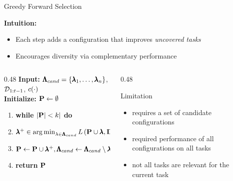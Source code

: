 \documentclass[main]{subfiles}
\begin{document}
\begin{frame}{Greedy Forward Selection}

\textbf{Intuition:}
\begin{itemize}
    \item Each step adds a configuration that improves \emph{uncovered tasks}
    \item Encourages diversity via complementary performance
\end{itemize}

\vspace{0.5cm}

\begin{columns}[T,onlytextwidth]
\begin{column}{0.48\textwidth}
\textbf{Input:} $\pmb{\Lambda}_{cand} = \{\pmb{\lambda}_1, \dots, \pmb{\lambda}_n\}$, $\mathcal{D}_{1:t-1}$, $c(\cdot)$ \\
\textbf{Initialize:} $\mathbf{P} \gets \emptyset$ \\
\begin{enumerate}
    \item \textbf{while $|\mathbf{P}| < k|$ do} \\
    \item \quad $\pmb{\lambda}^+ \in \operatorname*{arg\,min}_{\lambda \in \pmb{\Lambda}_{cand}} L \left(\mathbf{P} \cup \pmb{\lambda}, \mathbf{D}_{meta} \right)$ \\
    \item \quad $\mathbf{P} \gets \mathbf{P} \cup \pmb{\lambda}^+, \pmb{\Lambda}_{cand} \gets \pmb{\Lambda}_{cand} \setminus \pmb{\lambda}^+$ \\
    \item \textbf{return $\mathbf{P}$}
\end{enumerate}
\end{column}
\begin{column}{0.48\textwidth}
{%
%
%
\begin{block}{\raggedright Limitation}
  \begin{itemize}
    \item requires a set of candidate configurations
    \item required performance of all configurations on all tasks
    \item not all tasks are relevant for the current task
  \end{itemize}
\end{block}
}%
\end{column}
\end{columns}
\vspace{0.5cm}

\end{frame}
\end{document}
